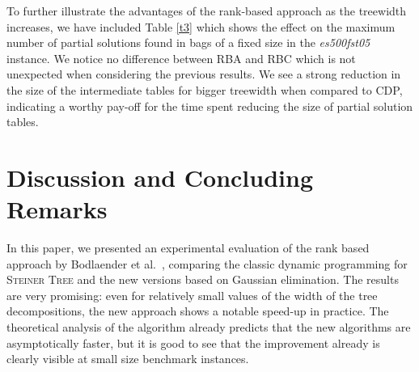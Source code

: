 \documentclass{llncs}
\begin{document}
\begin{table}[!h]
\caption{The maximum number of partial solutions found in bags of a fixed size during the execution of the three algorithms for the \emph{es500fst05} instance}
\label{t3}
\end{table}


To further illustrate the advantages of the rank-based approach as the
treewidth increases, we have included Table \ref{t3} which shows the effect on the maximum number of partial solutions found in bags of a fixed size in the \emph{es500fst05} instance. We notice no difference between RBA and RBC which is not unexpected when considering the previous results. We see a strong reduction in the size of the intermediate tables for bigger treewidth when compared to CDP, indicating a worthy pay-off for the time spent reducing the size of partial solution tables.

\section{Discussion and Concluding Remarks}
\label{section:conclusions}
In this paper, we presented an experimental evaluation of the rank based approach by Bodlaender et al.~\cite{BodlaenderCKN12}, comparing the classic dynamic programming for 
\textsc{Steiner Tree} and the new versions based on Gaussian elimination. The results are very promising:
even for relatively small values of the width of the tree decompositions, the new approach shows
a notable speed-up in practice.
The theoretical analysis of the algorithm already predicts that the new algorithms are asymptotically faster,
but it is good to see that the improvement already is clearly visible at small size benchmark instances.
\end{document}
